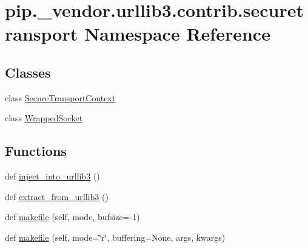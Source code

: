 \hypertarget{namespacepip_1_1__vendor_1_1urllib3_1_1contrib_1_1securetransport}{}\section{pip.\+\_\+vendor.\+urllib3.\+contrib.\+securetransport Namespace Reference}
\label{namespacepip_1_1__vendor_1_1urllib3_1_1contrib_1_1securetransport}
\subsection*{Classes}
\begin{DoxyCompactItemize}
\item 
class \hyperlink{classpip_1_1__vendor_1_1urllib3_1_1contrib_1_1securetransport_1_1SecureTransportContext}{Secure\+Transport\+Context}
\item 
class \hyperlink{classpip_1_1__vendor_1_1urllib3_1_1contrib_1_1securetransport_1_1WrappedSocket}{Wrapped\+Socket}
\end{DoxyCompactItemize}
\subsection*{Functions}
\begin{DoxyCompactItemize}
\item 
def \hyperlink{namespacepip_1_1__vendor_1_1urllib3_1_1contrib_1_1securetransport_a1d3a599e9615c078c3ccca4aa5a131c0}{inject\+\_\+into\+\_\+urllib3} ()
\item 
def \hyperlink{namespacepip_1_1__vendor_1_1urllib3_1_1contrib_1_1securetransport_a319448b077a361bc39ae54bc15db4348}{extract\+\_\+from\+\_\+urllib3} ()
\item 
def \hyperlink{namespacepip_1_1__vendor_1_1urllib3_1_1contrib_1_1securetransport_a498d39e3a7d94de7f5d4fe2d946ca74d}{makefile} (self, mode, bufsize=-\/1)
\item 
def \hyperlink{namespacepip_1_1__vendor_1_1urllib3_1_1contrib_1_1securetransport_af25ce137531922220be145a1db010f5a}{makefile} (self, mode=\char`\"{}r\char`\"{}, buffering=None, args, kwargs)
\end{DoxyCompactItemize}
